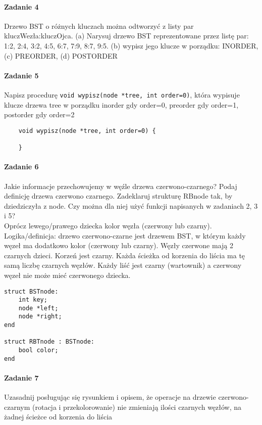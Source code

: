 \documentclass[18pt]{extarticle}
\begin{document}
\paragraph{Zadanie 4} Drzewo BST o różnych kluczach można odtworzyć z listy par kluczWezła:kluczOjca. (a) Narysuj drzewo BST reprezentowane przez listę par: 1:2, 2:4, 3:2, 4:5, 6:7, 7:9, 8:7, 9:5.
(b) wypisz jego klucze w porządku: INORDER, (c) PREORDER, (d) POSTORDER

\paragraph{Zadanie 5} Napisz procedurę \verb|void wypisz(node *tree, int order=0)|, która wypisuje klucze drzewa tree w porządku inorder gdy order=0, preorder gdy order=1, postorder gdy order=2 \\


\begin{lstlisting}
    void wypisz(node *tree, int order=0) {
        
    }

\end{lstlisting}

\paragraph{Zadanie 6} Jakie informacje przechowujemy w węźle drzewa czerwono-czarnego? Podaj definicję drzewa czerwono czarnego. Zadeklaruj strukturę RBnode tak, by dziedziczyła z node. Czy można dla niej użyć funkcji napisanych w zadaniach 2, 3 i 5? \\

Oprócz lewego/prawego dziecka kolor węzła (czerwony lub czarny). 
Logika/definicja: drzewo czerwono-czarne jest drzewem BST, w którym każdy węzeł ma dodatkowo kolor (czerwony lub czarny). Węzły czerwone mają 2 czarnych dzieci. Korzeń jest czarny. Każda ścieżka od korzenia do liścia ma tę samą liczbę czarnych węzłów. Każdy liść jest czarny (wartownik) a czerwony węzeł nie może mieć czerwonego dziecka. \\

\begin{lstlisting}
struct BSTnode:
    int key;	 
    node *left;	 
    node *right;
end

struct RBTnode : BSTnode:
    bool color;	 
end
\end{lstlisting}

\paragraph{Zadanie 7} Uzasadnij posługując się rysunkiem i opisem, że operacje na drzewie czerwono-czarnym (rotacja i przekolorowanie) nie zmieniają ilości czarnych węzłów, na żadnej ścieżce od korzenia
do liścia
\end{document}
